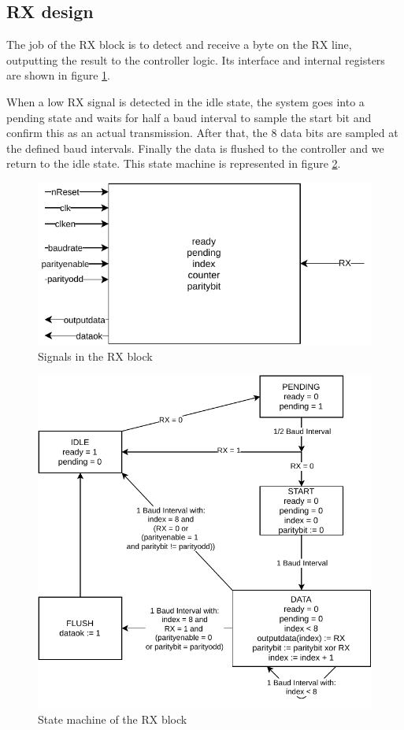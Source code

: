 \documentclass[12pt,a4paper]{article}
\begin{document}
\subsection{RX design}

The job of the RX block is to detect and receive a byte on the RX line, outputting the result to the controller logic. Its interface and internal registers are shown in figure \ref{fig:rx}.

When a low RX signal is detected in the idle state, the system goes into a pending state and waits for half a baud interval to sample the start bit and confirm this as an actual transmission. After that, the 8 data bits are sampled at the defined baud intervals. Finally the data is flushed to the controller and we return to the idle state. This state machine is represented in figure \ref{fig:smrx}.

\begin{figure}[h]
	\centering
	\includegraphics[width=.7\textwidth]{rx}
	\caption{Signals in the RX block}
	\label{fig:rx}
\end{figure}

\begin{figure}[h!]
	\centering
	\includegraphics[width=.8\textwidth]{smrx}
	\caption{State machine of the RX block}
	\label{fig:smrx}
\end{figure}
\end{document}
